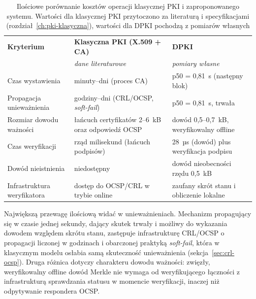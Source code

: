\begin{table}[htbp]
    \centering
    \caption{Ilościowe porównanie kosztów operacji klasycznej PKI i zaproponowanego systemu. Wartości dla klasycznej PKI przytoczono za literaturą i specyfikacjami (rozdział~\ref{ch:pki-klasyczna}), wartości dla DPKI pochodzą z pomiarów własnych}
    \label{tab:porownanie-wyd}
    \renewcommand{\arraystretch}{1.15}
    \begin{tabular}{L{0.27\textwidth} L{0.31\textwidth} L{0.31\textwidth}}
        \toprule
        \textbf{Kryterium}          & \textbf{Klasyczna PKI (X.509 + CA)}              & \textbf{DPKI}                            \\
                                    & \emph{\small dane literaturowe}                  & \emph{\small pomiary własne}             \\
        \midrule
        Czas wystawienia            & minuty--dni (proces CA)                          & p50 = 0,81~s (następny blok)             \\
        \addlinespace
        Propagacja unieważnienia    & godziny--dni (CRL/OCSP, \emph{soft-fail})        & p50 = 0,81~s, trwała                     \\
        \addlinespace
        Rozmiar dowodu ważności     & łańcuch certyfikatów 2--6~kB oraz odpowiedź OCSP & dowód 0,5--0,7~kB, weryfikowalny offline \\
        \addlinespace
        Czas weryfikacji            & rząd milisekund (łańcuch podpisów)               & 28~µs (dowód) plus weryfikacja podpisu   \\
        \addlinespace
        Dowód nieistnienia          & niedostępny                                      & dowód nieobecności rzędu 0,5~kB          \\
        \addlinespace
        Infrastruktura weryfikatora & dostęp do OCSP/CRL w trybie online               & zaufany skrót stanu i obliczenie lokalne \\
        \bottomrule
    \end{tabular}
\end{table}

Największą przewagę ilościową widać w unieważnieniach. Mechanizm propagujący się w czasie jednej sekundy, dający skutek trwały i możliwy do wykazania dowodem względem skrótu stanu, zastępuje infrastrukturę CRL/OCSP o propagacji liczonej w godzinach i obarczonej praktyką \emph{soft-fail}, która w klasycznym modelu osłabia samą skuteczność unieważnienia (sekcja~\ref{sec:crl-ocsp}). Druga różnica dotyczy charakteru dowodu ważności: zwięzły, weryfikowalny offline dowód Merkle nie wymaga od weryfikującego łączności z infrastrukturą sprawdzania statusu w momencie weryfikacji, inaczej niż odpytywanie respondera OCSP.

